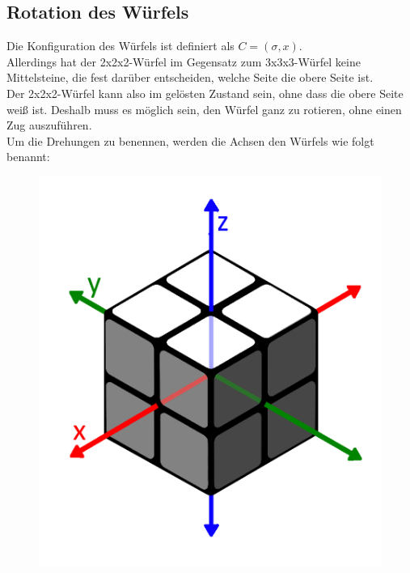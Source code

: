 \documentclass[12pt,a4paper, usenames, dvipsnames]{article}
\begin{document}








\subsection*{Rotation des Würfels}

Die Konfiguration des Würfels ist definiert als $C=(\sigma, x)$. \\
Allerdings hat der 2x2x2-Würfel im Gegensatz zum 3x3x3-Würfel keine Mittelsteine, die fest darüber entscheiden, welche Seite die obere Seite ist. \\
Der 2x2x2-Würfel kann also im gelösten Zustand sein, ohne dass die obere Seite weiß ist. Deshalb muss es möglich sein, den Würfel ganz zu rotieren, ohne einen Zug auszuführen. \\
Um die Drehungen zu benennen, werden die Achsen den Würfels wie folgt benannt:
\begin{figure}[H]
\centering
\includegraphics[scale=0.13]{Pfeile.png}
\caption[Würfel mit $x, y$ und $z$-Achsen]{}
\end{figure} 
\end{document}
